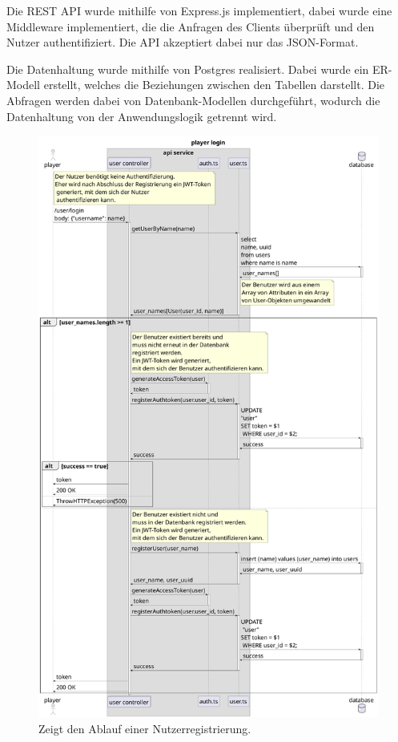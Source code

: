 \documentclass[
]{article}
\begin{document}
Die REST API wurde mithilfe von Express.js implementiert, dabei wurde eine Middleware implementiert, die die Anfragen des Clients
überprüft und den Nutzer authentifiziert. Die API akzeptiert dabei nur das JSON-Format.

Die Datenhaltung wurde mithilfe von Postgres realisiert. Dabei wurde ein ER-Modell erstellt, welches die Beziehungen
zwischen den Tabellen darstellt. Die Abfragen werden dabei von Datenbank-Modellen durchgeführt, wodurch die Datenhaltung
von der Anwendungslogik getrennt wird. 

\begin{figure}[H]
  \centering
  \includegraphics[width=\textwidth ]{resources/login.pdf}
  \caption{Zeigt den Ablauf einer Nutzerregistrierung.}
  \label{fig:ablaufdiagramm-login}
\end{figure}
\end{document}
